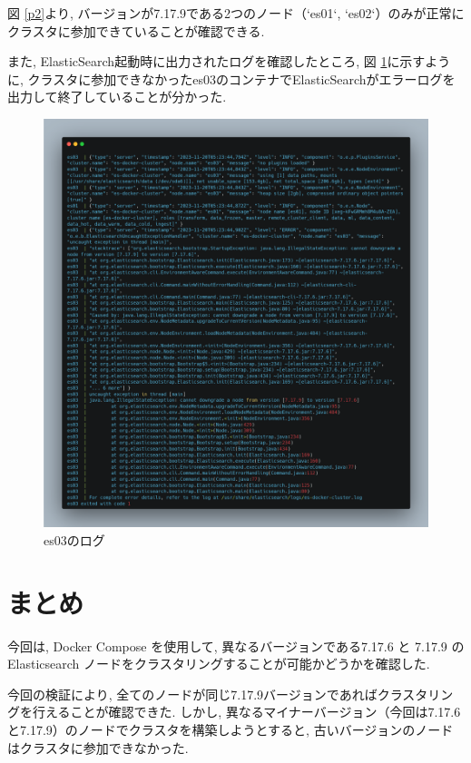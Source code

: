 \documentclass[a4j,12pt,]{jarticle}
\begin{document}
図 \ref{p2}より, バージョンが7.17.9である2つのノード（`es01`, `es02`）のみが正常にクラスタに参加できていることが確認できる.

また, ElasticSearch起動時に出力されたログを確認したところ, 図 \ref{p3}に示すように, クラスタに参加できなかったes03のコンテナでElasticSearchがエラーログを出力して終了していることが分かった.

\begin{figure}[H]
  \begin{center}
    \includegraphics[width=160mm]{log.png}
    \caption{es03のログ}
    \label{p3}
  \end{center}
\end{figure}

\section{まとめ}
今回は, Docker Compose を使用して, 異なるバージョンである7.17.6 と 7.17.9 の Elasticsearch ノードをクラスタリングすることが可能かどうかを確認した.

今回の検証により, 全てのノードが同じ7.17.9バージョンであればクラスタリングを行えることが確認できた. しかし, 異なるマイナーバージョン（今回は7.17.6と7.17.9）のノードでクラスタを構築しようとすると, 古いバージョンのノードはクラスタに参加できなかった.
\end{document}
